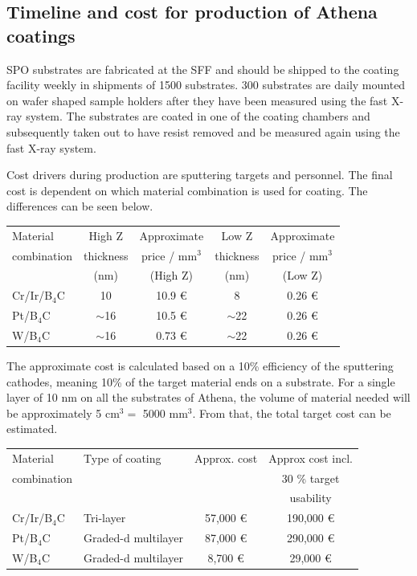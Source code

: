 \subsection{Timeline and cost for production of Athena coatings}
SPO substrates are fabricated at the SFF and should be shipped to the coating facility weekly in shipments of 1500 substrates. 300 substrates are daily mounted on wafer shaped sample holders after they have been measured using the fast X-ray system. The substrates are coated in one of the coating chambers and subsequently taken out to have resist removed and be measured again using the fast X-ray system.

Cost drivers during production are sputtering targets and personnel. The final cost is dependent on which material combination is used for coating. The differences can be seen below.

\begin{table}[htbp]
	\centering
\begin{tabular}{l|c|c|c|c}
Material 	& High Z 		& Approximate & Low Z  & Approximate \\
combination & thickness & price / mm$^3$ & thickness &  price / mm$^3$ \\
 & (nm) & (High Z) & (nm) &  (Low Z) \\
\hline
\hline
Cr/Ir/B$_4$C & 10 & 10.9 \euro & 8 & 0.26 \euro\\
\hline
Pt/B$_4$C & $\sim$16 & 10.5 \euro & $\sim$22 & 0.26 \euro\\
\hline
W/B$_4$C & $\sim$16 & 0.73 \euro & $\sim$22 & 0.26 \euro\\
\end{tabular}
\end{table}

The approximate cost is calculated based on a 10\% efficiency of the sputtering cathodes, meaning 10\% of the target material ends on a substrate. For a single layer of 10 nm on all the substrates of Athena, the volume of material needed will be approximately 5 cm$^3 = $ 5000 mm$^3$. From that, the total target cost can be estimated.

\begin{table}[htbp]
	\centering
\begin{tabular}{l|l|c|c}
Material 	& Type of coating & Approx. cost & Approx cost incl. \\
combination	&	&	&	30 \% target \\
&	&	&	usability\\
\hline
\hline
Cr/Ir/B$_4$C & Tri-layer & 57,000 \euro & 190,000 \euro \\
\hline
Pt/B$_4$C & Graded-d multilayer & 87,000 \euro & 290,000 \euro\\
\hline
W/B$_4$C & Graded-d multilayer & 8,700 \euro & 29,000 \euro \\
\end{tabular}
\end{table}


